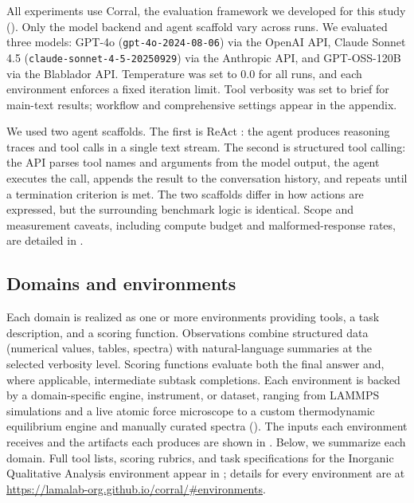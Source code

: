 All experiments use Corral, the evaluation framework we developed for this study (). Only the model backend and agent scaffold vary across runs. We evaluated three models: GPT-4o (\texttt{gpt-4o-2024-08-06}) via the OpenAI API, Claude Sonnet 4.5 (\texttt{claude-sonnet-4-5-20250929}) via the Anthropic API, and GPT-OSS-120B via the Blablador API. Temperature was set to 0.0 for all runs, and each environment enforces a fixed iteration limit. Tool verbosity was set to brief for main-text results; workflow and comprehensive settings appear in the appendix.

We used two agent scaffolds. The first is ReAct \autocite{yao2022react}: the agent produces reasoning traces and tool calls in a single text stream. The second is structured tool calling: the API parses tool names and arguments from the model output, the agent executes the call, appends the result to the conversation history, and repeats until a termination criterion is met. The two scaffolds differ in how actions are expressed, but the surrounding benchmark logic is identical. Scope and measurement caveats, including compute budget and malformed-response rates, are detailed in .

\subsection{Domains and environments} \label{sec:domains_and_environments}
 
Each domain is realized as one or more environments providing tools, a task description, and a scoring function. Observations combine structured data (numerical values, tables, spectra) with natural-language summaries at the selected verbosity level. Scoring functions evaluate both the final answer and, where applicable, intermediate subtask completions. Each environment is backed by a domain-specific engine, instrument, or dataset, ranging from LAMMPS simulations and a live atomic force microscope to a custom thermodynamic equilibrium engine and manually curated spectra (). The inputs each environment receives and the artifacts each produces are shown in . Below, we summarize each domain. Full tool lists, scoring rubrics, and task specifications for the Inorganic Qualitative Analysis environment appear in ; details for every environment are at \url{https://lamalab-org.github.io/corral/#environments}.
 
